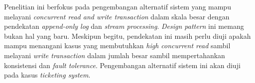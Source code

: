 Penelitian ini berfokus pada pengembangan alternatif sistem yang mampu melayani \textit{concurrent read and write transaction} dalam skala besar dengan pendekatan \textit{append-only log} dan \textit{stream processing}. \textit{Design pattern} ini memang bukan hal yang baru. Meskipun begitu, pendekatan ini masih perlu diuji apakah mampu menangani kasus yang membutuhkan \textit{high concurrent read} sambil melayani \textit{write transaction} dalam jumlah besar sambil mempertahankan konsistensi dan \textit{fault tolerance}. Pengembangan alternatif sistem ini akan diuji pada kasus \textit{ticketing system}.
